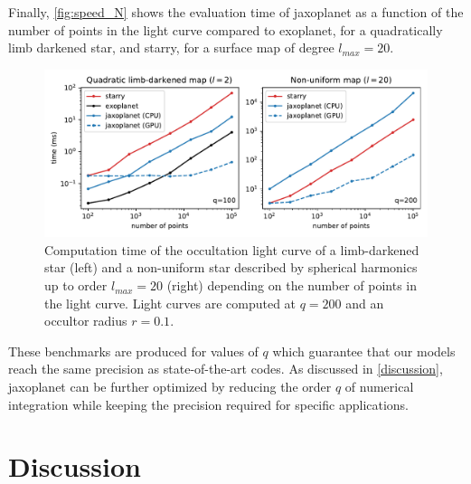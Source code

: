 \documentclass[modern]{aastex631}
\begin{document}
Finally, \autoref{fig:speed_N} shows the evaluation time of \textsf{jaxoplanet} as a function of the number of points in the light curve compared to \textsf{exoplanet}, for a quadratically limb darkened star, and \textsf{starry}, for a surface map of degree $l_{max} = 20$.
\begin{figure}[H]
    \begin{center}
        \includegraphics[width=\textwidth]{../workflows/speed/figures/speed_vs_N.pdf}
        \caption{Computation time of the occultation light curve of a limb-darkened star (left) and a non-uniform star described by spherical harmonics up to order $l_{max}=20$ (right) depending on the number of points in the light curve. Light curves are computed at $q=200$ and an occultor radius $r=0.1$.}
        \label{fig:speed_N}
    \end{center}
\end{figure}
These benchmarks are produced for values of $q$ which guarantee that our models reach the same precision as state-of-the-art codes. As discussed in \autoref{discussion}, \textsf{jaxoplanet} can be further optimized by reducing the order $q$ of numerical integration while keeping the precision required for specific applications.

\section{Discussion}\label{discussion}
\end{document}
